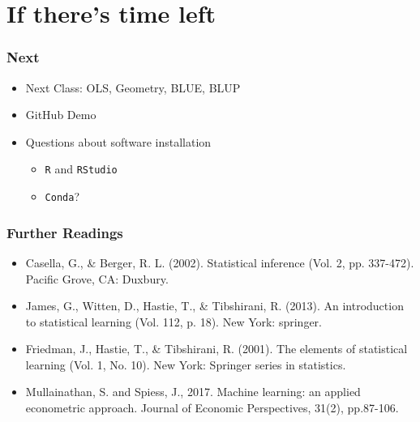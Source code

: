 \documentclass[
  shownotes,
  xcolor={svgnames},
  hyperref={colorlinks,citecolor=DarkBlue,linkcolor=DarkRed,urlcolor=DarkBlue}
  ]{beamer}
\begin{document}

\section{If there's time left}

\begin{frame}
\frametitle{Next}

  \begin{itemize}
  \item  Next Class: OLS, Geometry, BLUE, BLUP
  \bigskip
  \item  GitHub Demo
  \bigskip
  \item Questions about software installation
  \medskip
    \begin{itemize}
      \item  \texttt{R} and \texttt{RStudio}
      \medskip
      \item \texttt{Conda}?
    \end{itemize}
  \end{itemize}


\end{frame}


\begin{frame}
\frametitle{Further Readings}

\begin{itemize}
  \item Casella, G., \& Berger, R. L. (2002). Statistical inference (Vol. 2, pp. 337-472). Pacific Grove, CA: Duxbury.
  \bigskip
  \item James, G., Witten, D., Hastie, T., \& Tibshirani, R. (2013). An introduction to statistical learning (Vol. 112, p. 18). New York: springer.
  \bigskip
  \item Friedman, J., Hastie, T., \& Tibshirani, R. (2001). The elements of statistical learning (Vol. 1, No. 10). New York: Springer series in statistics.
  \bigskip
  \item Mullainathan, S. and Spiess, J., 2017. Machine learning: an applied econometric approach. Journal of Economic Perspectives, 31(2), pp.87-106.


\end{itemize}

\end{frame}

\end{document}
